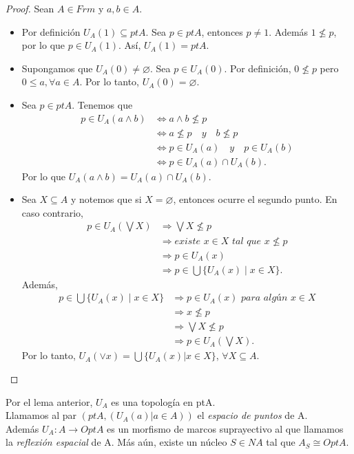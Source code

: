 \documentclass[12pt,letterpaper,titlepage]{article}
\let\emptyset\varnothing
\theoremstyle{definition}
\renewcommand\sup{\vee}
\newcommand\<{\langle}
\renewcommand\>{\rangle}
\begin{document}
\begin{proof}
  Sean $A\in Frm$ y $a,b\in A$.
\begin{itemize}
\item Por definición $U_A(1)\subseteq ptA$. Sea $p\in ptA$, entonces $p\neq 1$. Además $1\not\leq p$, por lo que $p\in U_A(1)$. Así, $U_A(1)=ptA$.
\item Supongamos que $U_A(0)\neq \emptyset$. Sea $p\in U_A(0)$. Por definición, $0\not\leq p$ pero $0\leq a, \forall a\in A$. Por lo tanto, $U_A(0)=\emptyset$.
\item Sea $p\in ptA$. Tenemos que
\begin{align*}
p\in U_A(a\wedge b)&\iff a\wedge b\not\leq p\\
&\iff a\not\leq p\quad y\quad b\not\leq p\\
&\iff p\in U_A(a)\quad y\quad p\in U_A(b)\\
&\iff p\in U_A(a)\cap U_A(b).
\end{align*}
Por lo que $U_A(a\wedge b)=U_A(a)\cap U_A(b)$.
\item Sea $X\subseteq A$ y notemos que si $X=\emptyset$, entonces ocurre el segundo punto. En caso contrario,
\begin{align*}
p\in U_A(\bigvee X)&\Rightarrow \bigvee X\not\leq p\\
&\Rightarrow \textit{existe }x\in X\textit{ tal que }x\not\leq p\\
&\Rightarrow p\in U_A(x)\\
&\Rightarrow p\in \bigcup \{U_A(x)\mid x\in X\}.
\end{align*}
Además,
\begin{align*}
p\in \bigcup\{U_A(x)\mid x\in X\}&\Rightarrow p\in U_A(x)\textit{ para algún }x\in X\\
&\Rightarrow x\not \leq p\\
&\Rightarrow \bigvee X\not\leq p\\
&\Rightarrow p\in U_A(\bigvee X).
\end{align*}
Por lo tanto, $U_A(\sup x)=\bigcup \{U_A(x)|x\in X\}$, $\forall X\subseteq A$.
\end{itemize}
\end{proof}
Por el lema anterior, $U_A$ es una topología en ptA.\\
Llamamos al par $\left(ptA, \left(U_A(a)|a\in A\right)\right)$ el \textit{espacio de puntos} de A.\\
Además $U_A\colon A\to OptA$ es un morfismo de marcos suprayectivo al que llamamos la \textit{reflexión espacial} de A. Más aún, existe un núcleo $S\in NA$ tal que $A_S\cong OptA$.\par 
\end{document}
